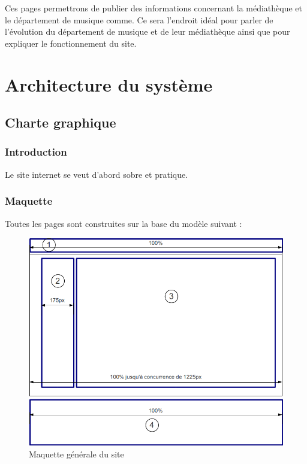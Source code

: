 \documentclass[letter, 11pt]{report}
\begin{document}
Ces pages permettrons de publier des informations concernant la médiathèque et le département de musique comme. Ce sera l'endroit idéal pour parler de l'évolution du département de musique et de leur médiathèque ainsi que pour expliquer le fonctionnement du site.

\chapter{Architecture du système}

\section{Charte graphique}

\subsection{Introduction}

Le site internet se veut d'abord sobre et pratique.

\subsection{Maquette}

Toutes les pages sont construites sur la base du modèle suivant :

\begin{figure}[htbp]
	\begin{center}
		\includegraphics[scale=0.6]{maquetteImage.png}
	\end{center}
	\caption{Maquette générale du site}
\end{figure}
\end{document}
